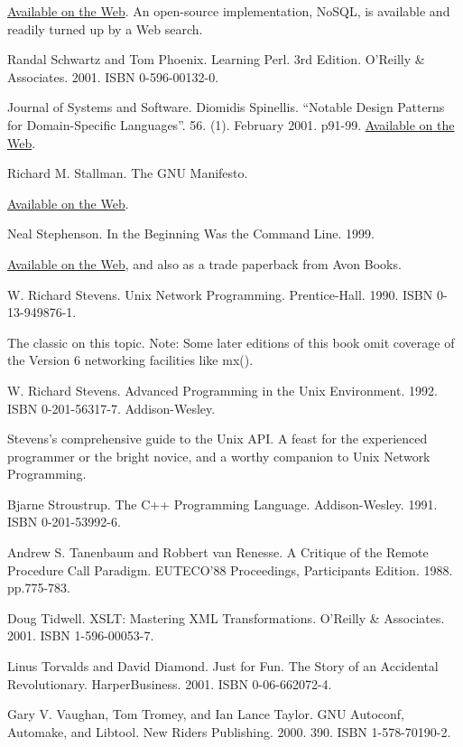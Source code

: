 \documentclass[12pt,oneside]{ctexbook}
\begin{document}
\begin{common-format}
\begin{thebibliography}{9}
\href{http://www.rdb.com/lib/4gl.pdf}{Available on the Web}. An open-source implementation, NoSQL, is available and readily turned up by a Web search.

 Randal Schwartz and Tom Phoenix. Learning Perl. 3rd Edition. O'Reilly \&{} Associates. 2001. ISBN 0-596-00132-0.

 Journal of Systems and Software. Diomidis Spinellis. “Notable Design Patterns for Domain-Specific Languages”. 56. (1). February 2001. p91-99. \href{http://www.catb.org/~esr/writings/taoup/html/apb.html}{Available on the Web}.

 Richard M. Stallman. The GNU Manifesto.

\href{http://www.gnu.org/gnu/manifesto.html}{Available on the Web}.

 Neal Stephenson. In the Beginning Was the Command Line. 1999.

\href{http://www.cryptonomicon.com/beginning.html}{Available on the Web}, and also as a trade paperback from Avon Books.

 W. Richard Stevens. Unix Network Programming. Prentice-Hall. 1990. ISBN 0-13-949876-1.

The classic on this topic. Note: Some later editions of this book omit coverage of the Version 6 networking facilities like mx().

 W. Richard Stevens. Advanced Programming in the Unix Environment. 1992. ISBN 0-201-56317-7. Addison-Wesley.

Stevens's comprehensive guide to the Unix API. A feast for the experienced programmer or the bright novice, and a worthy companion to Unix Network Programming.

 Bjarne Stroustrup. The C++ Programming Language. Addison-Wesley. 1991. ISBN 0-201-53992-6.

 Andrew S. Tanenbaum and Robbert van Renesse. A Critique of the Remote Procedure Call Paradigm. EUTECO'88 Proceedings, Participants Edition. 1988. pp.775-783.

 Doug Tidwell. XSLT: Mastering XML Transformations. O'Reilly \&{}  Associates. 2001. ISBN 1-596-00053-7.

 Linus Torvalds and David Diamond. Just for Fun. The Story of an Accidental Revolutionary. HarperBusiness. 2001. ISBN 0-06-662072-4.

 Gary V. Vaughan, Tom Tromey, and Ian Lance Taylor. GNU Autoconf, Automake, and Libtool. New Riders Publishing. 2000. 390. ISBN 1-578-70190-2.


\end{thebibliography}
\end{common-format}
\end{document}
